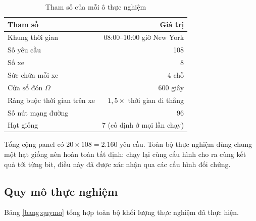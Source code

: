 \begin{table}[htbp]
\centering
\caption{Tham số của mỗi ô thực nghiệm}
\label{bang:thamso}
\small
\begin{tabular}{@{}lr@{}}
\toprule
\textbf{Tham số} & \textbf{Giá trị}\\
\midrule
Khung thời gian & 08:00--10:00 giờ New York\\
Số yêu cầu & 108\\
Số xe & 8\\
Sức chứa mỗi xe & 4 chỗ\\
Cửa sổ đón $\Omega$ & 600 giây\\
Ràng buộc thời gian trên xe & $1{,}5 \times$ thời gian đi thẳng\\
Số nút mạng đường & 96\\
Hạt giống & 7 (cố định ở mọi lần chạy)\\
\bottomrule
\end{tabular}
\end{table}

Tổng cộng panel có $20 \times 108 = 2{.}160$ yêu cầu. Toàn bộ thực nghiệm dùng chung một hạt
giống nên hoàn toàn tất định: chạy lại cùng cấu hình cho ra cùng kết quả tới từng bit, điều này
đã được xác nhận qua các cấu hình đối chứng.

\subsection{Quy mô thực nghiệm}

Bảng \ref{bang:quymo} tổng hợp toàn bộ khối lượng thực nghiệm đã thực hiện.

